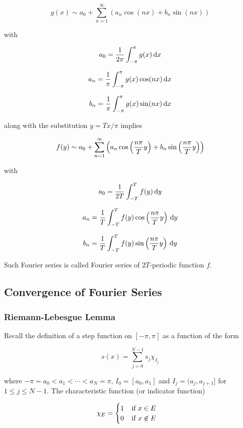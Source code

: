 \documentclass[a4paper,12pt]{article}
\begin{document}
$$g(x)\sim a_{0}+\sum_{n=1}^{\infty}(a_{n}\cos(nx)+b_{n}\sin(nx))$$\s

with

$$a_{0}=\frac{1}{2\pi}\int_{-\pi}^{\pi}g(x)\,\mathrm{d} x$$\s

$$a_{n}=\frac{1}{\pi}\int_{-\pi}^{\pi}g(x)\cos(nx)\,\mathrm{d} x$$\s

$$b_{n}=\frac{1}{\pi}\int_{-\pi}^{\pi}g(x)\sin(nx)\,\mathrm{d} x$$\s

along with the substitution $y=Tx/\pi$ implies

$$f(y)\sim a_{0}+\sum_{n=1}^{\infty}\left( a_{n}\cos\left( \frac{n\pi}{T}y\right)+b_{n}\sin\left( \frac{n\pi}{T}y\right)\right)$$\s

with

$$a_{0}=\frac{1}{2T}\int_{-T}^{T}f(y)\,\mathrm{d} y$$\s

$$a_{n}=\frac{1}{T}\int_{-T}^{T}f(y)\cos\left( \frac{n\pi}{T}y\right)\,\mathrm{d} y$$\s

$$b_{n}=\frac{1}{T}\int_{-T}^{T}f(y)\sin\left( \frac{n\pi}{T}y\right)\,\mathrm{d} y$$\s

Such Fourier series is called Fourier series of $2T$-periodic function $f$.

\subsection{Convergence of Fourier Series}
\subsubsection{Riemann-Lebesgue Lemma}
Recall the definition of a step function on $[-\pi,\pi]$ as a function of the form

$$s(x)=\sum_{j=0}^{N-1}s_{j}\chi_{I_{j}}$$\s

where $-\pi=a_{0}<a_{1}<\cdots<a_{N}=\pi$, $I_{0}=[a_{0},a_{1}]$ and $I_{j}=(a_{j},a_{j+1}]$ for $1\leq j\leq N-1$. The characteristic function (or indicator function)

$$\chi_{E}=\begin{cases}
  1\;\;\;\;\text{if }x\in E\\
  0\;\;\;\;\text{if }x\not\in E
\end{cases}$$\s
\end{document}
